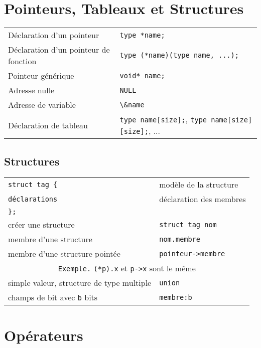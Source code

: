 \documentclass{article}
\newcommand{\key}[2]{#1 &\texttt{#2} \\ }
\newcommand{\keyg}[2]{\texttt{#2}&#1\\}
\newcommand{\exemple}[1]{\multicolumn{2}{c}{\texttt{Exemple.} #1}\\}
\newcommand{\tab}{\hspace{2em}}
\newenvironment{keylist}
     {\noindent\begin{tabular*}{\linewidth}{ll}} %
     {\end{tabular*}}
\newcommand{\cd}{\lstinline}
\begin{document}
\begin{multicols*}{3}
\section*{Pointeurs, Tableaux et Structures}
\begin{tabularx}{\linewidth}{Xl}
  Déclaration d'un pointeur & \cd{type *name;} \\
  Déclaration d'un pointeur de fonction & \cd{type (*name)(type name, ...);} \\
  Pointeur générique & \cd{void* name;} \\
  Adresse nulle & \cd{NULL} \\
  Adresse de variable & \cd{\&name} \\
  Déclaration de tableau & \cd{type name[size];}, \cd{type name[size][size];}, ... \\
\end{tabularx}

\subsection*{Structures}
\begin{keylist}
\keyg{modèle de la structure}{struct \texttt{tag} \{}
\keyg{déclaration des membres}{\tab\texttt{déclarations}}
\keyg{}{\};}
\key{créer une structure}{struct \texttt{tag} \texttt{nom}}
\key{membre d'une structure}{\texttt{nom}.\texttt{membre}}
\key{membre d'une structure pointée}{\texttt{pointeur}->\texttt{membre}}
\exemple{\texttt{(*p).x} et \texttt{p->x} sont le même}
\key{simple valeur, structure de type multiple}{union}
\key{champs de bit avec \texttt{b} bits}{\texttt{membre}:\texttt{b}}
\end{keylist}

\section*{Opérateurs}


\end{multicols*}
\end{document}
